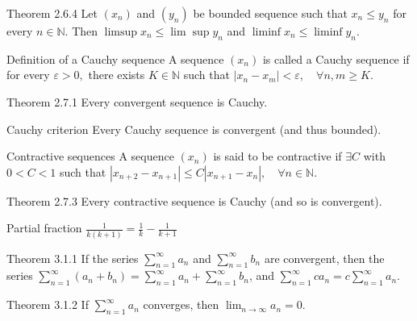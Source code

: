 \documentclass[10pt,landscape]{article}
\theoremstyle{definition}
\newcommand{\thistheoremname}{}
\newtheorem*{genericthm*}{\thistheoremname}
\newenvironment{namedthm*}[1]
{\renewcommand{\thistheoremname}{#1}\begin{genericthm*}}
{\end{genericthm*}}
\begin{document}
\begin{multicols}{3}
	\begin{namedthm*}{Theorem 2.6.4}
		Let \(\left(x_{n}\right)\) and \(\left(y_{n}\right)\) be bounded sequence such that \(x_{n} \leq y_{n}\) for every \(n \in \mathbb{N}\). Then \(\limsup x_{n} \leq \lim \sup y_{n}\) and \(\liminf x_{n} \leq \liminf y_{n}\).
	\end{namedthm*}

	\begin{namedthm*}{Definition of a Cauchy sequence}
		A sequence \(\left(x_{n}\right)\) is called a Cauchy sequence if for every \(\varepsilon>0,\) there exists \(K \in \mathbb{N}\) such that \(\left|x_{n}-x_{m}\right|<\varepsilon, \quad \forall n, m \geq K\).
	\end{namedthm*}

	\begin{namedthm*}{Theorem 2.7.1}
		Every convergent sequence is Cauchy.
	\end{namedthm*}

	\begin{namedthm*}{Cauchy criterion}
		Every Cauchy sequence is convergent (and thus bounded).
	\end{namedthm*}

	\begin{namedthm*}{Contractive sequences}
		A sequence \(\left(x_{n}\right)\) is said to be contractive if \(\exists C\) with \(0<C<1\) such that \(\left|x_{n+2}-x_{n+1}\right| \leq C\left|x_{n+1}-x_{n}\right|, \quad \forall n \in \mathbb{N}\).
	\end{namedthm*}

	\begin{namedthm*}{Theorem 2.7.3}
		Every contractive sequence is Cauchy (and so is convergent).
	\end{namedthm*}

	\begin{namedthm*}{Partial fraction}
		\(\frac{1}{k(k+1)}=\frac{1}{k}-\frac{1}{k+1}\)
	\end{namedthm*}

	\begin{namedthm*}{Theorem 3.1.1}
		If the series \(\sum_{n=1}^{\infty} a_{n}\) and \(\sum_{n=1}^{\infty} b_{n}\) are convergent, then the series \(\sum_{n=1}^{\infty}\left(a_{n}+b_{n}\right)=\sum_{n=1}^{\infty} a_{n}+\sum_{n=1}^{\infty} b_{n}\), and \(\sum_{n=1}^{\infty} c a_{n}=c \sum_{n=1}^{\infty} a_{n}\).
	\end{namedthm*}

	\begin{namedthm*}{Theorem 3.1.2}
		If \(\sum_{n=1}^{\infty} a_{n}\) converges, then \(\lim _{n \rightarrow \infty} a_{n}=0\).
	\end{namedthm*}


\end{multicols}
\end{document}

